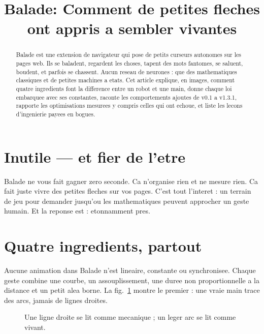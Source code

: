 \documentclass[10pt,conference]{IEEEtran}
\begin{document}
\title{Balade: Comment de petites fleches ont appris a sembler vivantes}
\author{}
\maketitle
\begin{abstract}
Balade est une extension de navigateur qui pose de petits curseurs autonomes
sur les pages web. Ils se baladent, regardent les choses, tapent des mots
fantomes, se saluent, boudent, et parfois se chassent. Aucun reseau de
neurones : que des mathematiques classiques et de petites machines a etats.
Cet article explique, en images, comment quatre ingredients font la difference
entre un robot et une main, donne chaque loi embarquee avec ses constantes,
raconte les comportements ajoutes de v0.1 a v1.3.1, rapporte les optimisations
mesurees y compris celles qui ont echoue, et liste les lecons d'ingenierie
payees en bogues.
\end{abstract}

\section{Inutile --- et fier de l'etre}
Balade ne vous fait gagner zero seconde. Ca n'organise rien et ne mesure
rien. Ca fait juste vivre des petites fleches sur vos pages. C'est tout
l'interet : un terrain de jeu pour demander jusqu'ou les mathematiques peuvent
approcher un geste humain. Et la reponse est : etonnamment pres.

\section{Quatre ingredients, partout}
Aucune animation dans Balade n'est lineaire, constante ou synchronisee.
Chaque geste combine une courbe, un assouplissement, une duree non
proportionnelle a la distance et un petit alea borne. La fig.~\ref{fig:arc}
montre le premier : une vraie main trace des arcs, jamais de lignes droites.

\begin{figure}[h]
\centering
{}
\caption{Une ligne droite se lit comme mecanique ; un leger arc se lit comme vivant.}
\label{fig:arc}
\end{figure}
\end{document}
